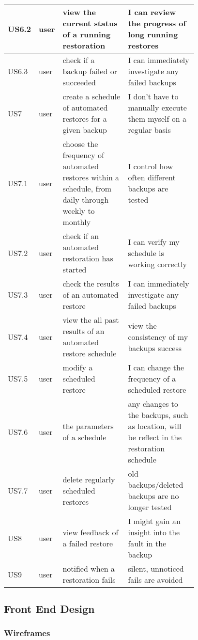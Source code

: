 \begin{table}[H]
\begin{tabular}{|l|l|p{0.39\linewidth}|p{0.39\linewidth}|}
				US6.2 & user & view the current status of a running restoration & I can review the progress of long running restores \\ \hline
				US6.3 & user & check if a backup failed or succeeded & I can immediately investigate any failed backups \\ \hline
				US7 & user & create a schedule of automated restores for a given backup & I don't have to manually execute them myself on a regular basis \\ \hline
				US7.1 & user & choose the frequency of automated restores within a schedule, from daily through weekly to monthly & I control how often different backups are tested \\ \hline
				US7.2 & user & check if an automated restoration has started & I can verify my schedule is working correctly \\ \hline
				US7.3 & user & check the results of an automated restore & I can immediately investigate any failed backups \\ \hline
				US7.4 & user & view the all past results of an automated restore schedule & view the consistency of my backups success \\ \hline
				US7.5 & user & modify a scheduled restore & I can change the frequency of a scheduled restore \\ \hline
				US7.6 & user & the parameters of a schedule & any changes to the backups, such as location, will be reflect in the restoration schedule \\ \hline
				US7.7 & user & delete regularly scheduled restores & old backups/deleted backups are no longer tested \\ \hline 

US8 & user & view feedback of a failed restore & I might gain an insight into the fault in the backup \\ \hline
				US9 & user & notified when a restoration fails & silent, unnoticed fails are avoided \\ \hline
			\end{tabular}
			\label{table:user-stories}
		\end{table}
		

        
	\subsection{Front End Design}
	\subsubsection{Wireframes}
	
